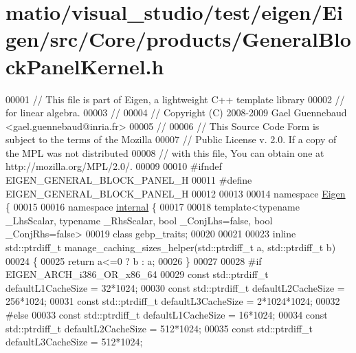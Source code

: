 \hypertarget{matio_2visual__studio_2test_2eigen_2_eigen_2src_2_core_2products_2_general_block_panel_kernel_8h_source}{}\section{matio/visual\+\_\+studio/test/eigen/\+Eigen/src/\+Core/products/\+General\+Block\+Panel\+Kernel.h}
\label{matio_2visual__studio_2test_2eigen_2_eigen_2src_2_core_2products_2_general_block_panel_kernel_8h_source}

\begin{DoxyCode}
00001 \textcolor{comment}{// This file is part of Eigen, a lightweight C++ template library}
00002 \textcolor{comment}{// for linear algebra.}
00003 \textcolor{comment}{//}
00004 \textcolor{comment}{// Copyright (C) 2008-2009 Gael Guennebaud <gael.guennebaud@inria.fr>}
00005 \textcolor{comment}{//}
00006 \textcolor{comment}{// This Source Code Form is subject to the terms of the Mozilla}
00007 \textcolor{comment}{// Public License v. 2.0. If a copy of the MPL was not distributed}
00008 \textcolor{comment}{// with this file, You can obtain one at http://mozilla.org/MPL/2.0/.}
00009 
00010 \textcolor{preprocessor}{#ifndef EIGEN\_GENERAL\_BLOCK\_PANEL\_H}
00011 \textcolor{preprocessor}{#define EIGEN\_GENERAL\_BLOCK\_PANEL\_H}
00012 
00013 
00014 \textcolor{keyword}{namespace }\hyperlink{namespace_eigen}{Eigen} \{
00015 
00016 \textcolor{keyword}{namespace }\hyperlink{namespaceinternal}{internal} \{
00017 
00018 \textcolor{keyword}{template}<\textcolor{keyword}{typename} \_LhsScalar, \textcolor{keyword}{typename} \_RhsScalar, \textcolor{keywordtype}{bool} \_ConjLhs=false, \textcolor{keywordtype}{bool} \_ConjRhs=false>
00019 \textcolor{keyword}{class }gebp\_traits;
00020 
00021 
00023 \textcolor{keyword}{inline} std::ptrdiff\_t manage\_caching\_sizes\_helper(std::ptrdiff\_t a, std::ptrdiff\_t b)
00024 \{
00025   \textcolor{keywordflow}{return} a<=0 ? b : a;
00026 \}
00027 
00028 \textcolor{preprocessor}{#if EIGEN\_ARCH\_i386\_OR\_x86\_64}
00029 \textcolor{keyword}{const} std::ptrdiff\_t defaultL1CacheSize = 32*1024;
00030 \textcolor{keyword}{const} std::ptrdiff\_t defaultL2CacheSize = 256*1024;
00031 \textcolor{keyword}{const} std::ptrdiff\_t defaultL3CacheSize = 2*1024*1024;
00032 \textcolor{preprocessor}{#else}
00033 \textcolor{keyword}{const} std::ptrdiff\_t defaultL1CacheSize = 16*1024;
00034 \textcolor{keyword}{const} std::ptrdiff\_t defaultL2CacheSize = 512*1024;
00035 \textcolor{keyword}{const} std::ptrdiff\_t defaultL3CacheSize = 512*1024;

\end{DoxyCode}
